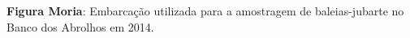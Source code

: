 \textbf{Figura Moria}: Embarcação utilizada para a amostragem de baleias-jubarte no Banco dos Abrolhos em 2014.